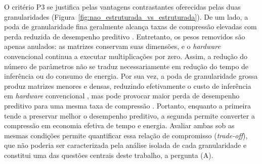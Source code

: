 O critério P3 se justifica pelas vantagens contrastantes oferecidas pelas duas
granularidades (Figura~\ref{fig:nao_estruturada_vs_estruturada}). De um lado, a poda de
granularidade fina geralmente alcança taxas de compressão elevadas com perda reduzida de
desempenho preditivo \cite{Blalock2020}. Entretanto, os pesos removidos são apenas anulados:
as matrizes conservam suas dimensões, e o \textit{hardware} convencional continua a
executar multiplicações por zero. Assim, a redução do número de parâmetros não se traduz
necessariamente em redução do tempo de inferência ou do consumo de energia. Por sua vez, a
poda de granularidade grossa produz matrizes menores e densas, reduzindo efetivamente o
custo de inferência em \textit{hardware} convencional \cite{Li2017}, mas pode provocar maior
perda de desempenho preditivo para uma mesma taxa de compressão \cite{Blalock2020}.
Portanto, enquanto a primeira tende a preservar melhor o desempenho preditivo, a segunda
permite converter a compressão em economia efetiva de tempo e energia. Avaliar ambas sob as
mesmas condições permite quantificar essa relação de compromisso (\textit{trade-off}), que
não poderia ser caracterizada pela análise isolada de cada granularidade e constitui uma das
questões centrais deste trabalho, a pergunta (A).


